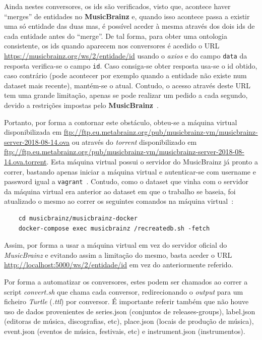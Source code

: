 \documentclass{article}
\begin{document}
Ainda nestes conversores, os ids são verificados, visto que, acontece haver ``merges'' de entidades no \textbf{MusicBrainz} e, quando isso acontece passa a existir uma só entidade das duas mas, é possível aceder à mesma através dos dois ids de cada entidade antes do ``merge''. De tal forma, para obter uma ontologia consistente, os ids quando aparecem nos conversores é acedido o URL \url{https://musicbrainz.org/ws/2/entidade/id} usando o \textit{axios} e do campo \texttt{data} da resposta verifica-se o campo \texttt{id}. Caso consiga-se obter resposta usa-se o id obtido, caso contrário (pode acontecer por exemplo quando a entidade não existe num dataset mais recente), mantém-se o atual. Contudo, o acesso através deste URL tem uma grande limitação, apenas se pode realizar um pedido a cada segundo, devido a restrições impostas pelo \textbf{MusicBrainz}~\cite{mbLimit}. 

Portanto, por forma a contornar este obstáculo, obteu-se a máquina virtual disponibilizada em \url{ftp://ftp.eu.metabrainz.org/pub/musicbrainz-vm/musicbrainz-server-2018-08-14.ova} ou através do \textit{torrent} disponibilizado em \url{ftp://ftp.eu.metabrainz.org/pub/musicbrainz-vm/musicbrainz-server-2018-08-14.ova.torrent}. Esta máquina virtual possui o servidor do MusicBrainz já pronto a correr, bastando apenas iniciar a máquina virtual e autenticar-se com username e password igual a \texttt{vagrant}~\cite{mbSetup}. Contudo, como o dataset que vinha com o servidor da máquina virtual era anterior ao dataset em que o trabalho se baseia, foi atualizado o mesmo ao correr os seguintes comandos na máquina virtual~\cite{mbUpdate}:

\begin{framed}
\begin{verbatim}
    cd musicbrainz/musicbrainz-docker
    docker-compose exec musicbrainz /recreatedb.sh -fetch
\end{verbatim}
\end{framed}

Assim, por forma a usar a máquina virtual em vez do servidor oficial do \textit{MusicBrainz} e evitando assim a limitação do mesmo, basta aceder o URL \url{http://localhost:5000/ws/2/entidade/id} em vez do anteriormente referido.

Por forma a automatizar os conversores, estes podem ser chamados ao correr a script \textit{convert.sh} que chama cada conversor, redirecionando o \textit{output} para um ficheiro \textit{Turtle} (\textit{.ttl}) por conversor. É importante referir também que não houve uso de dados provenientes de series.json (conjuntos de releases-groups), label.json (editoras de música, discografias, etc), place.json (locais de produção de música), event.json (eventos de música, festivais, etc) e instrument.json (instrumentos).
\end{document}
